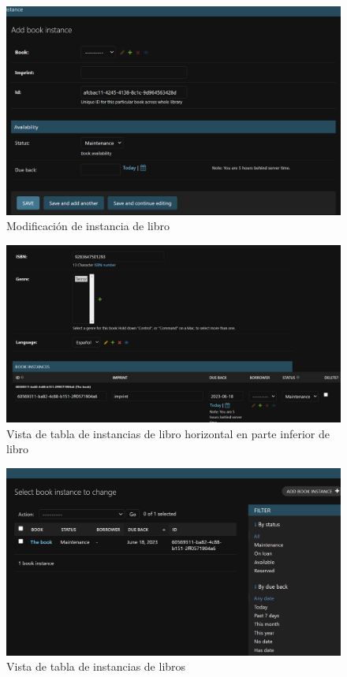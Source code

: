 \documentclass{article}
\begin{document}
    \begin{figure}[H]
        \centering
        \includegraphics[scale=0.42]{img/img8.png}
        \caption{Modificación de instancia de libro}
        \label{fig:imagen}
    \end{figure}

    \begin{figure}[H]
        \centering
        \includegraphics[scale=0.42]{img/img9.png}
        \caption{Vista de tabla de instancias de libro horizontal en parte inferior de libro}
        \label{fig:imagen}
    \end{figure}

    \begin{figure}[H]
        \centering
        \includegraphics[scale=0.42]{img/img10.png}
        \caption{Vista de tabla de instancias de libros}
        \label{fig:imagen}
    \end{figure}
\end{document}
